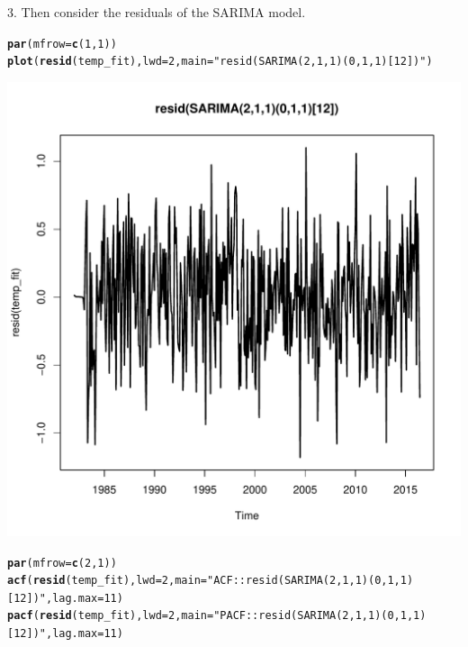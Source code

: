 \documentclass[10pt]{article}\usepackage[]{graphicx}\usepackage[]{color}
\makeatletter
\def\maxwidth{ %
  \ifdim\Gin@nat@width>\linewidth
    \linewidth
  \else
    \Gin@nat@width
  \fi
}
\newcommand{\hlnum}[1]{\textcolor[rgb]{0.686,0.059,0.569}{#1}}%
\newcommand{\hlstr}[1]{\textcolor[rgb]{0.192,0.494,0.8}{#1}}%
\newcommand{\hlstd}[1]{\textcolor[rgb]{0.345,0.345,0.345}{#1}}%
\newcommand{\hlkwc}[1]{\textcolor[rgb]{0.333,0.667,0.333}{#1}}%
\newcommand{\hlkwd}[1]{\textcolor[rgb]{0.737,0.353,0.396}{\textbf{#1}}}%
\newenvironment{kframe}{%
 \def\at@end@of@kframe{}%
 \ifinner\ifhmode%
  \def\at@end@of@kframe{\end{minipage}}%
  \begin{minipage}{\columnwidth}%
 \fi\fi%
 \def\FrameCommand##1{\hskip\@totalleftmargin \hskip-\fboxsep
 \colorbox{shadecolor}{##1}\hskip-\fboxsep
     \hskip-\linewidth \hskip-\@totalleftmargin \hskip\columnwidth}%
 \MakeFramed {\advance\hsize-\width
   \@totalleftmargin\z@ \linewidth\hsize
   \@setminipage}}%
 {\par\unskip\endMakeFramed%
 \at@end@of@kframe}
\newenvironment{knitrout}{}{} %
\makeatother
\begin{document}
3. Then consider the residuals of the SARIMA model.
\begin{knitrout}
\color{fgcolor}\begin{kframe}
\begin{alltt}
\hlkwd{par}\hlstd{(}\hlkwc{mfrow}\hlstd{=}\hlkwd{c}\hlstd{(}\hlnum{1}\hlstd{,}\hlnum{1}\hlstd{))}
\hlkwd{plot}\hlstd{(}\hlkwd{resid}\hlstd{(temp_fit),}\hlkwc{lwd}\hlstd{=}\hlnum{2}\hlstd{,} \hlkwc{main}\hlstd{=}\hlstr{"resid(SARIMA(2,1,1)(0,1,1)[12])"}\hlstd{)}
\end{alltt}
\end{kframe}
\includegraphics[width=\maxwidth]{figure/unnamed-chunk-28-1} 
\begin{kframe}\begin{alltt}
\hlkwd{par}\hlstd{(}\hlkwc{mfrow}\hlstd{=}\hlkwd{c}\hlstd{(}\hlnum{2}\hlstd{,}\hlnum{1}\hlstd{))}
\hlkwd{acf}\hlstd{(}\hlkwd{resid}\hlstd{(temp_fit),}\hlkwc{lwd}\hlstd{=}\hlnum{2}\hlstd{,} \hlkwc{main}\hlstd{=}\hlstr{"ACF::resid(SARIMA(2,1,1)(0,1,1)[12])"}\hlstd{,}\hlkwc{lag.max} \hlstd{=} \hlnum{11}\hlstd{)}
\hlkwd{pacf}\hlstd{(}\hlkwd{resid}\hlstd{(temp_fit),}\hlkwc{lwd}\hlstd{=}\hlnum{2}\hlstd{,} \hlkwc{main}\hlstd{=}\hlstr{"PACF::resid(SARIMA(2,1,1)(0,1,1)[12])"}\hlstd{,}\hlkwc{lag.max} \hlstd{=} \hlnum{11}\hlstd{)}
\end{alltt}

\end{kframe}
\end{knitrout}
\end{document}
